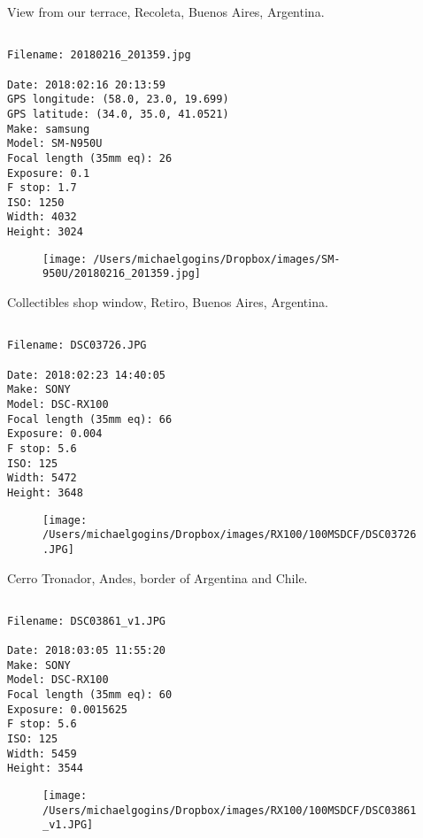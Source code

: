\clearpage
\onecolumn
\noindent View from our terrace, Recoleta, Buenos Aires, Argentina.
\noindent
\begin{lstlisting}

Filename: 20180216_201359.jpg

Date: 2018:02:16 20:13:59
GPS longitude: (58.0, 23.0, 19.699)
GPS latitude: (34.0, 35.0, 41.0521)
Make: samsung
Model: SM-N950U
Focal length (35mm eq): 26
Exposure: 0.1
F stop: 1.7
ISO: 1250
Width: 4032
Height: 3024
\end{lstlisting}
\clearpage

\begin{figure}
\texttt{[image: /Users/michaelgogins/Dropbox/images/SM-950U/20180216\_201359.jpg]}
\end{figure}
    
\clearpage
\onecolumn
\noindent Collectibles shop window, Retiro, Buenos Aires, Argentina.
\noindent
\begin{lstlisting}

Filename: DSC03726.JPG

Date: 2018:02:23 14:40:05
Make: SONY
Model: DSC-RX100
Focal length (35mm eq): 66
Exposure: 0.004
F stop: 5.6
ISO: 125
Width: 5472
Height: 3648
\end{lstlisting}
\clearpage

\begin{figure}
\texttt{[image: /Users/michaelgogins/Dropbox/images/RX100/100MSDCF/DSC03726.JPG]}
\end{figure}
    
\clearpage
\onecolumn
\noindent Cerro Tronador, Andes, border of Argentina and Chile.
\noindent
\begin{lstlisting}

Filename: DSC03861_v1.JPG

Date: 2018:03:05 11:55:20
Make: SONY
Model: DSC-RX100
Focal length (35mm eq): 60
Exposure: 0.0015625
F stop: 5.6
ISO: 125
Width: 5459
Height: 3544
\end{lstlisting}
\clearpage

\begin{figure}
\texttt{[image: /Users/michaelgogins/Dropbox/images/RX100/100MSDCF/DSC03861\_v1.JPG]}
\end{figure}
    
